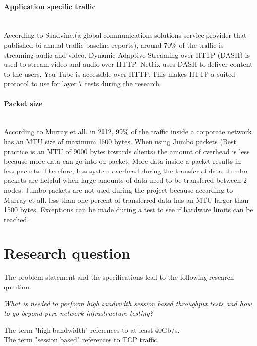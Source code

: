 \paragraph{Application specific traffic}\mbox{} \\
According to Sandvine\cite{phenomena_2017},(a global communications solutions service provider that published bi-annual traffic baseline reports), around 70\% of the traffic is streaming audio and video. 
Dynamic Adaptive Streaming over HTTP (DASH)\cite{dash} is used to stream video and audio over HTTP. Netflix uses DASH to deliver content to the users. You Tube is accessible over HTTP.
This makes HTTP a suited protocol to use for layer 7 tests during the research.  

\paragraph{Packet size}\label{par:packetsize}\mbox{}\\
According to Murray et all. \cite{murray2012state}  in 2012, 99\% of the traffic inside a corporate network has an MTU size of maximum 1500 bytes. When using Jumbo packets\cite{alliance_2017} (Best practice is an MTU of 9000 bytes towards clients\cite{jet}) the amount of overhead is less because more data can go into on packet. 
More data inside a packet results in less packets. Therefore, less system overhead during the transfer of data. 
Jumbo packets are helpful when large amounts of data need to be transfered between 2 nodes.  
Jumbo packets are not used during the project because according to Murray et all. less than one percent of transferred data has an MTU larger than 1500 bytes. 
Exceptions can be made during a test to see if hardware limits can be reached.

\section{Research question}\label{sec:researchquestion}
The problem statement and the specifications lead to the following research question.

\begin{center}
\textit{What is needed to perform high bandwidth session based throughput tests and how to go beyond pure network infrastructure testing?} \\
\end{center}
The term "high bandwidth" references to at least 40Gb/s. \\
The term "session based" references to TCP traffic. \\

